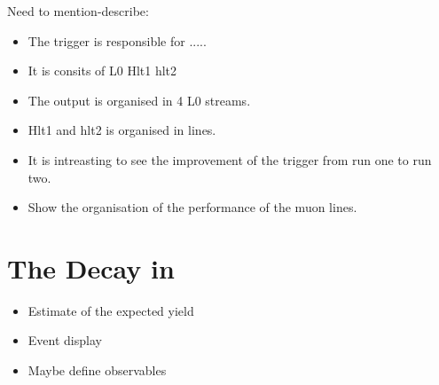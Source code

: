 Need to mention-describe:
\begin{itemize}
  \item The trigger is responsible for .....
  \item It is consits of L0 Hlt1 hlt2
  \item The output is organised in 4 L0 streams.
  \item Hlt1 and hlt2 is organised in lines.
  \item It is intreasting to see the improvement of the trigger from run one to run two.
  \item Show the organisation of the performance of the muon lines.
\end{itemize}

\section{The \BJpsiKst Decay in \lhcb}
\label{BspsiKst_at_lhcb}
\begin{itemize}
  \item Estimate of the expected yield
  \item Event display
  \item Maybe define observables
\end{itemize}
